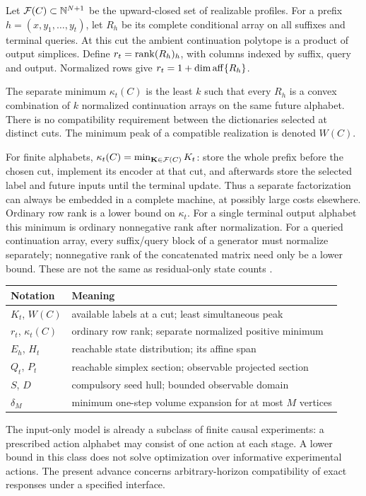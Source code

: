 Let $\mathcal F(C)\subset\mathbb N^{N+1}$ be the upward-closed set of realizable
profiles. For a prefix $h=(x,y_1,\ldots,y_t)$, let $R_h$ be its complete
conditional array on all suffixes and terminal queries. At this cut the
ambient continuation polytope is a product of output simplices. Define
$r_t=\operatorname{rank}(R_h)_h$, with columns indexed by suffix, query and output.
Normalized rows give $r_t=1+\dim\operatorname{aff}\{R_h\}$.

\begin{definition}\label{def:separate}
The separate minimum $\kappa_t(C)$ is the least $k$ such that every
$R_h$ is a convex combination of $k$ normalized continuation arrays on
the same future alphabet. There is no compatibility requirement between
the dictionaries selected at distinct cuts. The minimum peak of a
compatible realization is denoted $W(C)$.
\end{definition}

For finite alphabets, $\kappa_t(C)=\min_{\mathbf K\in\mathcal F(C)}K_t$:
store the whole prefix before the chosen cut, implement its encoder at
that cut, and afterwards store the selected label and future inputs
until the terminal update. Thus a separate factorization can always be
embedded in a complete machine, at possibly large costs elsewhere.
Ordinary row rank is a lower bound on $\kappa_t$.
For a single terminal output alphabet this minimum is ordinary
nonnegative rank after normalization. For a queried continuation array,
every suffix/query block of a generator must normalize separately;
nonnegative rank of the concatenated matrix need only be a lower bound.
These are not the same as residual-only state counts \cite{GG,DE}.

\begin{center}
\small
\begin{tabular}{ll}
\toprule
Notation & Meaning\\\midrule
$K_t$, $W(C)$ & available labels at a cut; least simultaneous peak\\
$r_t$, $\kappa_t(C)$ & ordinary row rank; separate normalized positive minimum\\
$E_h$, $H_t$ & reachable state distribution; its affine span\\
$Q_t$, $P_t$ & reachable simplex section; observable projected section\\
$S$, $D$ & compulsory seed hull; bounded observable domain\\
$\delta_M$ & minimum one-step volume expansion for at most $M$ vertices\\
\bottomrule
\end{tabular}
\end{center}

The input-only model is already a subclass of finite causal experiments:
a prescribed action alphabet may consist of one action at each stage.
A lower bound in this class does not solve optimization over informative
experimental actions. The present advance concerns arbitrary-horizon
compatibility of exact responses under a specified interface.
